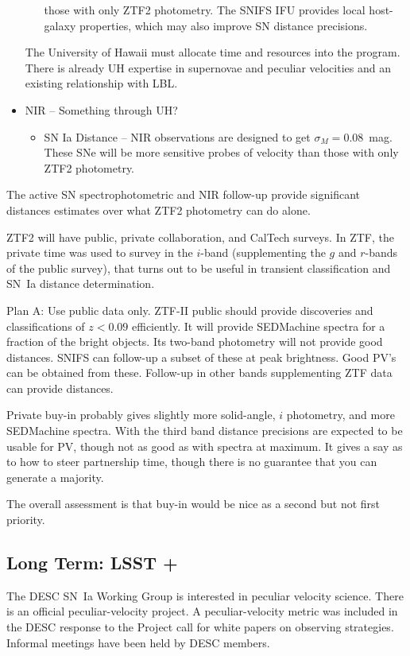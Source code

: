 \begin{itemize}
\begin{itemize}
those with only ZTF2 photometry.  The SNIFS IFU provides local host-galaxy properties, which may also improve SN distance precisions.
\end{itemize}
The University of Hawaii must allocate time and resources into the program.  There is already UH expertise in supernovae and peculiar velocities and an existing relationship
with LBL.
\item NIR -- Something through UH?
\begin{itemize}
\item SN Ia Distance -- NIR observations are designed to get $\sigma_M=0.08$~mag.  These SNe will be more sensitive probes of velocity
than those with only ZTF2 photometry.
\end{itemize}
\end{itemize}
The active SN spectrophotometric and NIR follow-up provide significant distances estimates over
what ZTF2 photometry can do alone.




ZTF2 will have public, private collaboration, and CalTech surveys.    In ZTF,
the private time was used to survey in the $i$-band (supplementing the $g$ and $r$-bands of the public survey), that turns out to be useful in transient classification and SN~Ia distance determination.

Plan A: Use public data only.  ZTF-II public should provide discoveries and classifications of $z<0.09$ efficiently.  It will provide SEDMachine spectra for a
fraction of the bright objects.  Its two-band photometry will not provide good distances.  SNIFS can follow-up a subset of these at peak brightness.
Good PV's can be obtained from these.  Follow-up in other bands supplementing ZTF data can provide distances.

Private buy-in probably gives slightly more solid-angle, $i$ photometry, and more SEDMachine spectra.  With the third band distance precisions are expected
to be usable for PV, though not as good as with spectra at maximum.  It gives a say as to how to steer partnership time, though there is no guarantee that
you can generate a majority.

The overall assessment is that buy-in would be nice as a second but not first priority.

\subsection{Long Term: LSST +}
The DESC SN~Ia Working Group is interested in peculiar velocity science.  There is an official peculiar-velocity project.  A peculiar-velocity
metric was included in the DESC response to the Project call for white papers on observing strategies.
Informal meetings have been held by DESC members.

